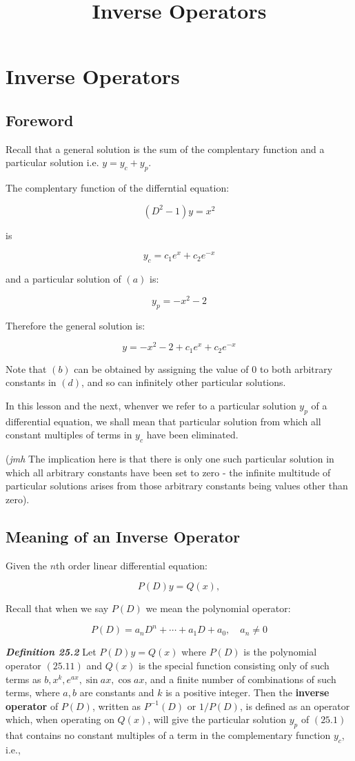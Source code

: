\documentclass{article}
\title{Inverse Operators}
\begin{document}
\section{Inverse Operators}

\subsection{Foreword}

Recall that a general solution is the sum of the complentary function and a  particular solution i.e. $y = y_c + y_p$.

The complentary function of the differntial equation:

\[ \tag{a} (D^2 -1)y = x^2 \]

is

\[ \tag{b} y_c = c_1 e^x + c_2 e^{-x} \]

and a particular solution of $(a)$ is:

\[ \tag{c} y_p = -x^2 - 2 \]

Therefore the general solution is:

\[ \tag{d} y = -x^2 - 2 + c_1 e^x + c_2 e^{-x} \]

Note that $(b)$ can be obtained by assigning the value of 0 to both arbitrary constants in $(d)$, and so can infinitely other particular solutions.

In this lesson and the next, whenver we refer to a particular solution $y_p$ of a differential equation, we shall mean that particular solution from which all constant multiples of terms in $y_c$ have been eliminated.

(\emph{jmh} The implication here is that there is only one such particular solution in which all arbitrary constants have been set to zero - the infinite multitude of particular solutions arises from those arbitrary constants being values other than zero).

\subsection{Meaning of an Inverse Operator}

Given the $n$th order linear differential equation:

\[ \tag{25.1} P(D)y = Q(x), \]

Recall that when we say $P(D)$ we mean the polynomial operator:

\[ \tag{25.11} P(D) = a_n D^n + \cdots + a_1 D + a_0, \quad a_n \neq 0 \]

\emph{\textbf{Definition 25.2}} Let $P(D)y = Q(x)$ where $P(D)$ is the polynomial operator $(25.11)$ and $Q(x)$ is the special function consisting only of such terms as $b, x^k, e^{ax}, \sin{ax}, \cos{ax}$, and a finite number of combinations of such terms, where $a, b$ are constants and $k$ is a positive integer. Then the \textbf{inverse operator} of $P(D)$, written as $P^{-1}(D)$ or $1/P(D)$, is defined as an operator which, when operating on $Q(x)$, will give the particular solution $y_p$ of $(25.1)$ that contains no constant multiples of a term in the complementary function $y_c$, i.e.,
\end{document}
